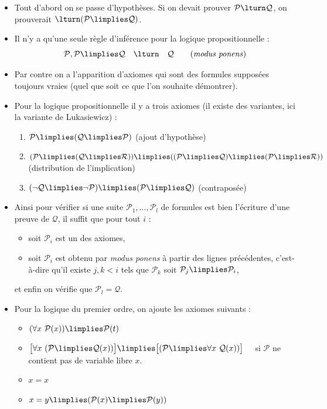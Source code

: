 \documentclass[11pt,class=report,crop=false]{standalone}
\begin{document}
\begin{itemize}
    \item Tout d'abord on se passe d'hypothèses. Si on devait prouver $\mathcal{P} \lturn \mathcal{Q}$, on prouverait $\lturn (\mathcal{P} \limplies \mathcal{Q})$.
    
    \item Il n'y a qu'une seule règle d'inférence pour la logique propositionnelle :
    \[ \mathcal{P}, \mathcal{P} \limplies \mathcal{Q} \quad \lturn \quad \mathcal{Q} \qquad \text{(\emph{modus ponens})} \]

    \item Par contre on a l'apparition d'axiomes qui sont des formules supposées toujours vraies (quel que soit ce que l'on souhaite démontrer).

    \item Pour la logique propositionnelle il y a trois axiomes (il existe des variantes, ici la variante de Lukasiewicz) :
\begin{enumerate}
    \item $\mathcal{P} \limplies (\mathcal{Q} \limplies \mathcal{P})$ \quad (ajout d'hypothèse)
    \item $(\mathcal{P} \limplies (\mathcal{Q} \limplies \mathcal{R})) \limplies ((\mathcal{P} \limplies \mathcal{Q}) \limplies (\mathcal{P} \limplies \mathcal{R}))$ \quad (distribution de l'implication)
    \item $(\neg \mathcal{Q} \limplies \neg \mathcal{P}) \limplies (\mathcal{P} \limplies \mathcal{Q})$ \quad (contraposée)
\end{enumerate}

    \item Ainsi pour vérifier si une suite $\mathcal{P}_1, \dots, \mathcal{P}_l$ de formules est bien l'écriture d'une preuve de $\mathcal{Q}$, il suffit que pour tout $i$ :
\begin{itemize}
    \item soit $\mathcal{P}_i$ est un des axiomes,
    \item soit $\mathcal{P}_i$ est obtenu par \emph{modus ponens} à partir des lignes précédentes, c'est-à-dire qu'il existe $j, k < i$ tels que $\mathcal{P}_k$ soit $\mathcal{P}_j \limplies \mathcal{P}_i$,
\end{itemize}
et enfin on vérifie que $\mathcal{P}_l = \mathcal{Q}$.

    \item Pour la logique du premier ordre, on ajoute les axiomes suivants :
    \begin{itemize}
        \item $(\forall x \ \mathcal{P}(x)) \limplies \mathcal{P}(t)$
        \item $\big[ \forall x \ (\mathcal{P} \limplies \mathcal{Q}(x)) \big]\limplies \big[ (\mathcal{P} \limplies \forall x \ \mathcal{Q}(x)) \big]$ \ \ si $\mathcal{P}$ ne contient pas de variable libre $x$.
        \item $x=x$
        \item $x=y \limplies (\mathcal{P}(x) \limplies \mathcal{P}(y))$
    \end{itemize}


\end{itemize}
\end{document}
